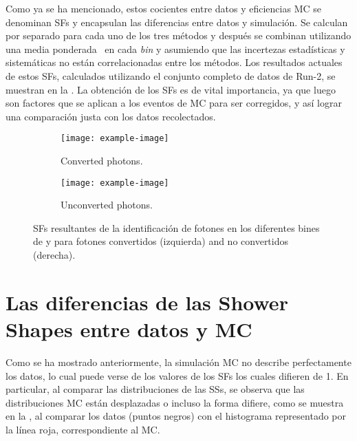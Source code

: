 Como ya se ha mencionado, estos cocientes entre datos y eficiencias \ac{MC} se denominan \acp{SF} y encapsulan las diferencias entre datos y simulación. Se calculan por separado para cada uno de los tres métodos y después se combinan utilizando una media ponderada~\cite{BLUEMethod} en cada \textit{bin} y asumiendo que las incertezas estadísticas y sistemáticas no están correlacionadas entre los métodos. Los resultados actuales de estos \acp{SF}, calculados utilizando el conjunto completo de datos de Run-2, se muestran en la \Fig{\ref{fig:pid_ss:pid:efficiencies:sfs}}. La obtenci\'on de los \acp{SF} es de vital importancia, ya que luego son factores que se aplican a los eventos de \ac{MC} para ser corregidos, y as\'i lograr una comparaci\'on justa con los datos recolectados.

\begin{figure}[ht!]
    \centering
    \begin{subfigure}[h]{0.49\linewidth}
        \centering
        \texttt{[image: example-image]}
        \caption{Converted photons.}
    \end{subfigure}
    \hfill
    \begin{subfigure}[h]{0.49\linewidth}
        \centering
        \texttt{[image: example-image]}
        \caption{Unconverted photons.}
    \end{subfigure}
    \caption{\acp{SF} resultantes de la identificaci\'on de fotones en los diferentes bines de \pt y \abseta para fotones convertidos (izquierda) and no convertidos (derecha). }
    \label{fig:pid_ss:pid:efficiencies:sfs}
\end{figure}


\section{Las diferencias de las Shower Shapes entre datos y \ac{MC}}
\label{sec:pid_ss:ss_differences}


Como se ha mostrado anteriormente, la simulación \ac{MC} no describe perfectamente los datos, lo cual puede verse de los valores de los \acp{SF} los cuales difieren de 1. En particular, al comparar las distribuciones de las \acp{SS}, se observa que las distribuciones \ac{MC} están desplazadas o incluso la forma difiere, como se muestra en la \Fig{\ref{fig:pid_ss:ss_differences:ss}}, al comparar los datos (puntos negros) con el histograma representado por la línea roja, correspondiente al \ac{MC}.

